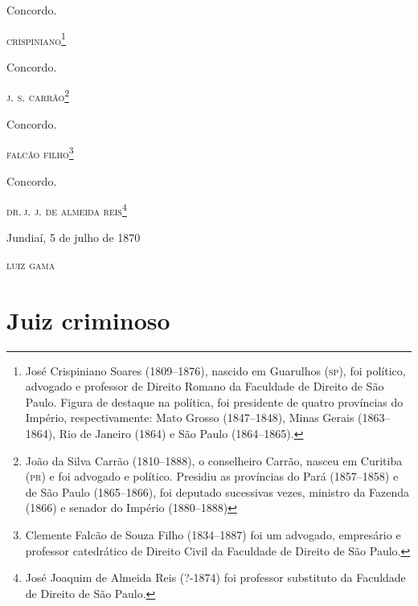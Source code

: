 Concordo.

\quad\textsc{crispiniano}\footnote{ José Crispiniano Soares (1809--1876),
  nascido em Guarulhos (\textsc{sp}), foi político, advogado e professor de
  Direito Romano da Faculdade de Direito de São Paulo. Figura de
  destaque na política, foi presidente de quatro províncias do Império,
  respectivamente: Mato Grosso (1847--1848), Minas Gerais (1863--1864),
  Rio de Janeiro (1864) e São Paulo (1864--1865).}

Concordo.

\quad\textsc{j. s. carrão}\footnote{ João da Silva Carrão (1810--1888), o
  conselheiro Carrão, nasceu em Curitiba (\textsc{pr}) e foi advogado e político.
  Presidiu as províncias do Pará (1857--1858) e de São Paulo (1865--1866),
  foi deputado sucessivas vezes, ministro da Fazenda (1866) e senador do
  Império (1880--1888)}

Concordo.

\quad\textsc{falcão filho}\footnote{ Clemente Falcão de Souza Filho
  (1834--1887) foi um advogado, empresário e professor catedrático de
  Direito Civil da Faculdade de Direito de São Paulo.}

Concordo.

\quad\textsc{dr.\,j. j. de almeida reis}\footnote{ José Joaquim de Almeida Reis
  (?-1874) foi professor substituto da Faculdade de Direito de São
  Paulo.}

\begin{flushright}
Jundiaí, 5 de julho de 1870

\textsc{luiz gama}
\end{flushright}

\part{Juiz criminoso}

